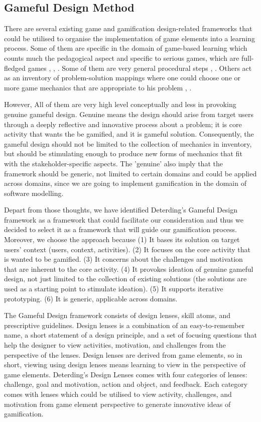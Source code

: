 \documentclass[12pt, a4paper]{report}
\begin{document}
\subsection{Gameful Design Method}
There are several existing game and gamification design-related frameworks that could be utilised to organise the implementation of game elements into a learning process. Some of them are specific in the domain of game-based learning which counts much the pedagogical aspect and specific to serious games, which are full-fledged games \cite{garris2002games}, \cite{yusoff2009conceptual}, \cite{de2011serious}. Some of them are very general procedural steps \cite{werbach2012win}, \cite{kumar2013framework}. Others act as an inventory of problem-solution mappings where one could choose one or more game mechanics that are appropriate to his problem \cite{arnab2015mapping}, \cite{chou2013octalysis}. 

However, All of them are very high level conceptually and less in provoking genuine gameful design. Genuine means the design should arise from target users through a deeply reflective and innovative process about a problem; it is core activity that wants the be gamified, and it is gameful solution. Consequently, the gameful design should not be limited to the collection of mechanics in inventory, but should be stimulating enough to produce new forms of mechanics that fit with the stakeholder-specific aspects. The 'genuine' also imply that the framework should be generic, not limited to certain domains and could be applied across domains, since we are going to implement gamification in the domain of software modelling.

Depart from those thoughts, we have identified Deterding's Gameful Design framework \cite{deterding2015lens} as a framework that could facilitate our consideration and thus we decided to select it as a framework that will guide our gamification process.  Moreover, we choose the approach because (1) It bases its solution on target users' context (users, context, activities). (2) It focuses on the core activity that is wanted to be gamified. (3) It concerns about the challenges and motivation that are inherent to the core activity. (4) It provokes ideation of genuine gameful design, not just limited to the collection of existing solutions (the solutions are used as a starting point to stimulate ideation). (5) It supports iterative prototyping. (6) It is generic, applicable across domains.               

The Gameful Design framework consists of design lenses, skill atoms, and prescriptive guidelines. Design lenses is a combination of an easy-to-remember name, a short statement of a design principle, and a set of focusing questions that help the designer to view activities, motivation, and challenges from the perspective of the lenses. Design lenses are derived from game elements, so in short, viewing using design lenses means learning to view in the perspective of game elements. Deterding's Design Lenses comes with four categories of lenses: challenge, goal and motivation, action and object, and feedback. Each category comes with lenses which could be utilised to view activity, challenges, and motivation from game element perspective to generate innovative ideas of gamification. 
\end{document}
